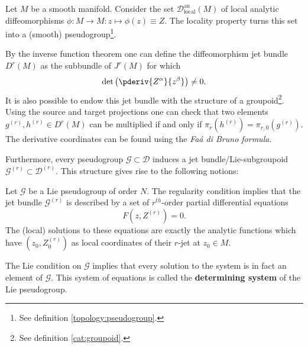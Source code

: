     \begin{example}
        Let $M$ be a smooth manifold. Consider the set $\mathcal{D}^{\text{an}}_{\text{local}}(M)$ of local analytic diffeomorphisms $\phi:M\rightarrow M:z\mapsto\phi(z)\equiv Z$. The locality property turns this set into a (smooth) pseudogroup\footnote{See definition \ref{topology:pseudogroup}.}.

        By the inverse function theorem one can define the diffeomorphism jet bundle $D^r(M)$ as the subbundle of $J^r(M)$ for which \[\det\left(\pderiv{Z^\alpha}{z^\beta}\right)\neq0.\] It is also possible to endow this jet bundle with the structure of a groupoid\footnote{See definition \ref{cat:groupoid}.}. Using the source and target projections one can check that two elements $g^{(r)}, h^{(r)}\in D^r(M)$ can be multiplied if and only if $\pi_r(h^{(r)}) = \pi_{r, 0}(g^{(r)})$. The derivative coordinates can be found using the \textit{Fa\'a di Bruno formula}.

        Furthermore, every pseudogroup $\mathcal{G}\subset\mathcal{D}$ induces a jet bundle/Lie-subgroupoid $\mathcal{G}^{(r)}\subset\mathcal{D}^{(r)}$. This structure gives rise to the following notions:
    \end{example}
    \begin{property}
        Let $\mathcal{G}$ be a Lie pseudogroup of order $N$. The regularity condition implies that the jet bundle $\mathcal{G}^{(r)}$ is described by a set of $r^{th}$-order partial differential equations \[F\left(z, Z^{(r)}\right) = 0.\] The (local) solutions to these equations are exactly the analytic functions which have $(z_0, Z^{(r)}_0)$ as local coordinates of their $r$-jet at $z_0\in M$.

        The Lie condition on $\mathcal{G}$ implies that every solution to the system is in fact an element of $\mathcal{G}$. This system of equations is called the \textbf{determining system} of the Lie pseudogroup.
    \end{property}

